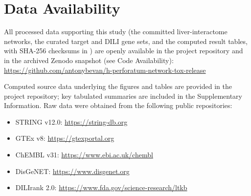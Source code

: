 \section*{Data Availability}

All processed data supporting this study (the committed liver-interactome networks, the curated target and DILI gene sets, and the computed result tables, with SHA-256 checksums in ) are openly available in the project repository and in the archived Zenodo snapshot (see Code Availability):
\url{https://github.com/antonybevan/h-perforatum-network-tox-release}

Computed source data underlying the figures and tables are provided in the project repository; key tabulated summaries are included in the Supplementary Information. Raw data were obtained from the following public repositories:
\begin{itemize}
    \item STRING v12.0: \url{https://string-db.org}
    \item GTEx v8: \url{https://gtexportal.org}
    \item ChEMBL v31: \url{https://www.ebi.ac.uk/chembl}
    \item DisGeNET: \url{https://www.disgenet.org}
    \item DILIrank 2.0: \url{https://www.fda.gov/science-research/ltkb}
\end{itemize}
